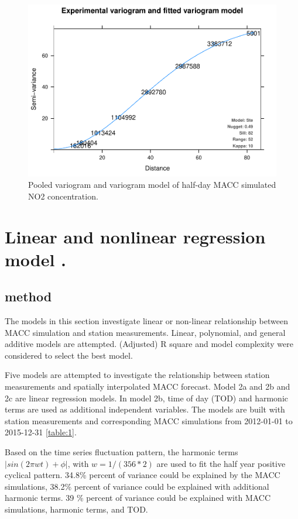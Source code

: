 \documentclass{article}
\begin{document}
\begin{figure}[tbp]
 \center
\includegraphics[scale = 0.8]{vno2.pdf}
\caption{ Pooled variogram and variogram model of half-day MACC simulated NO2 concentration.}
\label{fig:vno2}
\end{figure}

\section{Linear and nonlinear regression model .}
\subsection{method}
The models in this section investigate linear or non-linear relationship between MACC simulation and station measurements. Linear,
polynomial, and general additive models are attempted. (Adjusted) R square and model complexity were considered to select the best model. 
  
Five models are attempted to investigate the relationship between station measurements and spatially interpolated MACC
forecast. Model 2a and 2b and 2c are linear regression models. In model 2b, time of day (TOD) and harmonic terms are used as additional
independent variables. The models are built with station measurements and corresponding MACC simulations from 2012-01-01 to 2015-12-31 \cref{table:1}.

Based on the time series fluctuation pattern, the harmonic terms $|sin(2 \pi wt) + \phi|$, with
$w = 1 / (356 * 2 )$ are used to fit the half year positive
cyclical pattern. 34.8\% percent of variance could be explained by the MACC simulations, 38.2\% percent of variance could be explained with additional harmonic terms. 39 \% percent of variance could be explained with MACC simulations, harmonic terms, and TOD. 
\end{document}
